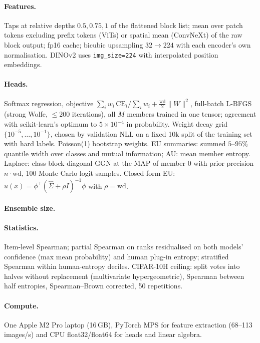 \paragraph{Features.} Taps at relative depths $0.5,0.75,1$ of the flattened block list; mean over patch tokens excluding prefix tokens (ViTs) or spatial mean (ConvNeXt) of the raw block output; fp16 cache; bicubic upsampling $32\to224$ with each encoder's own normalisation. DINOv2 uses \texttt{img\_size=224} with interpolated position embeddings.

\paragraph{Heads.} Softmax regression, objective $\sum_iw_i\,\mathrm{CE}_i/\sum_iw_i+\frac{\mathrm{wd}}2\|W\|^2$, full-batch L-BFGS (strong Wolfe, $\le200$ iterations), all $M$ members trained in one tensor; agreement with scikit-learn's optimum to $5\times10^{-4}$ in probability. Weight decay grid $\{10^{-5},\dots,10^{-1}\}$, chosen by validation NLL on a fixed 10k split of the training set with hard labels. Poisson(1) bootstrap weights. EU summaries: summed $5$--$95\%$ quantile width over classes and mutual information; AU: mean member entropy. Laplace: class-block-diagonal GGN at the MAP of member 0 with prior precision $n\cdot\mathrm{wd}$, 100 Monte Carlo logit samples. Closed-form EU: $u(x)=\phi^\top(\hat\Sigma+\rho I)^{-1}\phi$ with $\rho=\mathrm{wd}$.

\paragraph{Ensemble size.} \MChoice

\paragraph{Statistics.} Item-level Spearman; partial Spearman on ranks residualised on both models' confidence (max mean probability) and human plug-in entropy; stratified Spearman within human-entropy deciles. CIFAR-10H ceiling: split votes into halves without replacement (multivariate hypergeometric), Spearman between half entropies, Spearman--Brown corrected, 50 repetitions.

\paragraph{Compute.} One Apple M2 Pro laptop (16\,GB), PyTorch MPS for feature extraction (68--113 images/s) and CPU float32/float64 for heads and linear algebra.

